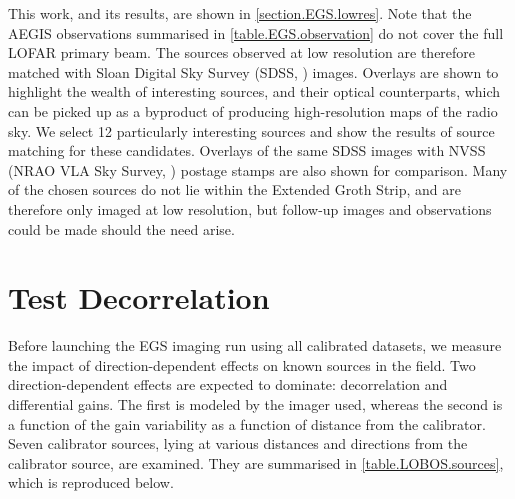 \pg
This work, and its results, are shown in \cref{section.EGS.lowres}. Note that the AEGIS observations summarised in \cref{table.EGS.observation} do not cover the full LOFAR primary beam. The sources observed at low resolution are therefore matched with Sloan Digital Sky Survey (SDSS, ) images. Overlays are shown to highlight the wealth of interesting sources, and their optical counterparts, which can be picked up as a byproduct of producing high-resolution maps of the radio sky. We select 12 particularly interesting sources and show the results of source matching for these candidates. Overlays of the same SDSS images with NVSS (NRAO VLA Sky Survey, ) postage stamps are also shown for comparison. Many of the chosen sources do not lie within the Extended Groth Strip, and are therefore only imaged at low resolution, but follow-up images and observations could be made should the need arise.

\section{Test Decorrelation}
\pg
Before launching the EGS imaging run using all calibrated datasets, we measure the impact of direction-dependent effects on known sources in the field. Two direction-dependent effects are expected to dominate: decorrelation and differential gains. The first is modeled by the imager used, whereas the second is a function of the gain variability as a function of distance from the calibrator. Seven calibrator sources, lying at various distances and directions from the calibrator source, are examined. They are summarised in \cref{table.LOBOS.sources}, which is reproduced below.

